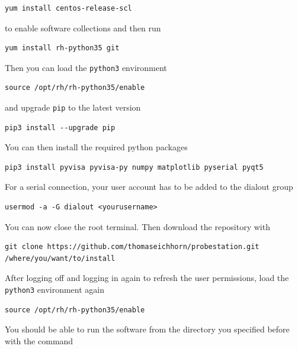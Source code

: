 \documentclass[a4paper]{article}
\begin{document}
\medskip
\begin{lstlisting}
yum install centos-release-scl
\end{lstlisting}
\medskip

to enable software collections and then run

\medskip
\begin{lstlisting}
yum install rh-python35 git
\end{lstlisting}
\medskip

Then you can load the {\tt python3} environment

\medskip
\begin{lstlisting}
source /opt/rh/rh-python35/enable
\end{lstlisting}
\medskip

and upgrade {\tt pip} to the latest version

\medskip
\begin{lstlisting}
pip3 install --upgrade pip
\end{lstlisting}
\medskip

You can then install the required python packages

\medskip
\begin{lstlisting}
pip3 install pyvisa pyvisa-py numpy matplotlib pyserial pyqt5
\end{lstlisting}
\medskip

For a serial connection, your user account has to be added to the dialout group

\medskip
\begin{lstlisting}
usermod -a -G dialout <yourusername>
\end{lstlisting}
\medskip

You can now close the root terminal.
Then download the repository with

\medskip
\begin{lstlisting}
git clone https://github.com/thomaseichhorn/probestation.git /where/you/want/to/install
\end{lstlisting}
\medskip

After logging off and logging in again to refresh the user permissions, load the {\tt python3} environment again

\medskip
\begin{lstlisting}
source /opt/rh/rh-python35/enable
\end{lstlisting}
\medskip

You should be able to run the software from the directory you specified before with the command
\end{document}
